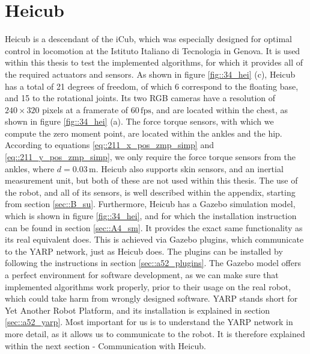 \section{Heicub}
\label{sec::34_he}
Heicub is a descendant of the iCub, which was especially designed for optimal control in locomotion at the Istituto Italiano di Tecnologia in Genova. It is used within this thesis to test the implemented algorithms, for which it provides all of the required actuators and sensors. As shown in figure \ref{fig::34_hei} (c), Heicub has a total of 21 degrees of freedom, of which 6 correspond to the floating base, and 15 to the rotational joints. Its two RGB cameras have a resolution of $240\times320$ pixels at a framerate of $60\,\text{fps}$, and are located within the chest, as shown in figure \ref{fig::34_hei} (a). The force torque sensors, with which we compute the zero moment point, are located within the ankles and the hip. According to equations \ref{eq::211_x_pos_zmp_simp} and \ref{eq::211_y_pos_zmp_simp}, we only require the force torque sensors from the ankles, where $d=0.03\,\text{m}$. Heicub also supports skin sensors, and an inertial measurement unit, but both of these are not used within this thesis. The use of the robot, and all of its sensors, is well described within the appendix, starting from section \ref{sec::B_su}. Furthermore, Heicub has a Gazebo simulation model, which is shown in figure \ref{fig::34_hei}, and for which the installation instruction can be found in section \ref{sec::A4_sm}. It provides the exact same functionality as its real equivalent does. This is achieved via Gazebo plugins, which communicate to the YARP network, just as Heicub does. The plugins can be installed by following the instructions in section \ref{sec::a52_plugins}. The Gazebo model offers a perfect environment for software development, as we can make sure that implemented algorithms work properly, prior to their usage on the real robot, which could take harm from wrongly designed software. YARP stands short for Yet Another Robot Platform, and its installation is explained in section \ref{sec::a52_yarp}. Most important for us is to understand the YARP network in more detail, as it allows us to communicate to the robot. It is therefore explained within the next section - Communication with Heicub.
